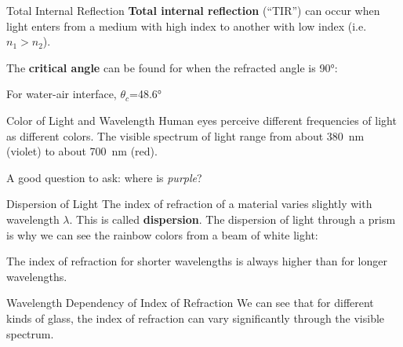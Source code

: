 \documentclass[12pt,compress,aspectratio=169]{beamer}
\begin{document}
\begin{frame}{Total Internal Reflection}
  \textbf{Total internal reflection} (``TIR'') can occur when light enters from
  a medium with high index to another with low index (i.e.\ $n_1>n_2$).
  \begin{center}
  \end{center}
  The \textbf{critical angle} can be found for when the refracted angle is
  \ang{90}:

  For water-air interface, $\theta_c$=\ang{48.6}
\end{frame}



\begin{frame}{Color of Light and Wavelength}
  Human eyes perceive different frequencies of light as different colors. The
  visible spectrum of light range from about \SI{380}{\nano\metre} (violet) to
  about \SI{700}{\nano\metre} (red).
  \begin{center}
  \end{center}
  A good question to ask: where is \emph{purple}?
\end{frame}



\begin{frame}{Dispersion of Light}
  The index of refraction of a material varies slightly with wavelength
  $\lambda$. This is called \textbf{dispersion}. The dispersion of light
  through a prism is why we can see the rainbow colors from a beam of white
  light:
  \begin{center}
  \end{center}
  The index of refraction for shorter wavelengths is always higher than for
  longer wavelengths.
\end{frame}



\begin{frame}{Wavelength Dependency of Index of Refraction}
  We can see that for different kinds of glass, the index of refraction can vary
  significantly through the visible spectrum.
  \begin{center}
  \end{center}
\end{frame}
\end{document}

